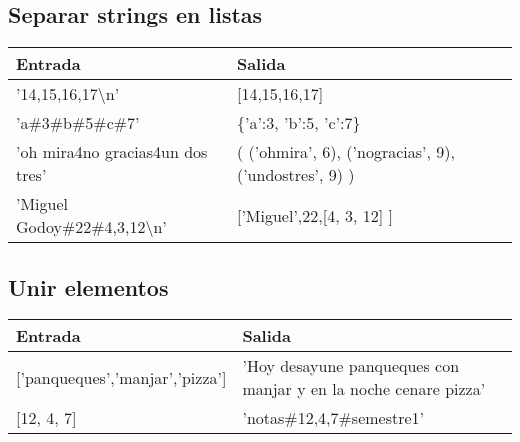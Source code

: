\subsection{Separar strings en listas}

\begin{table}[h]
	\centering
	\label{split}
	\begin{tabular}{|l|l|}
		\hline
		\textbf{Entrada}                 & \textbf{Salida}                                       \\ \hline
		'14,15,16,17\textbackslash n'                  & {[}14,15,16,17{]}                                     \\ \hline
		'a\#3\#b\#5\#c\#7'               & \{'a':3, 'b':5, 'c':7\}                               \\ \hline
		'oh mira4no gracias4un dos tres' & ( ('ohmira', 6), ('nogracias', 9), ('undostres', 9) ) \\ \hline
		'Miguel Godoy\#22\#4,3,12\textbackslash n'     & {[}'Miguel',22,{[}4, 3, 12{]} {]}                     \\ \hline
	\end{tabular}
\end{table}

\subsection{Unir elementos}
\begin{table}[h]
	\centering
	\label{format y join}
	\begin{tabular}{|l|l|}
		\hline
		\textbf{Entrada}                    & \textbf{Salida}                                                 \\ \hline
		{[}'panqueques','manjar','pizza'{]} & 'Hoy desayune panqueques con manjar y en la noche cenare pizza' \\ \hline
		{[}12, 4, 7{]}                      & 'notas\#12,4,7\#semestre1'                                     \\ \hline
	\end{tabular}
\end{table}